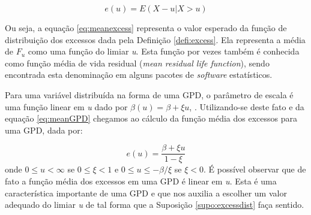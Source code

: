 \documentclass[review]{elsarticle}
\theoremstyle{definition}
\begin{document}
\begin{equation}
\label{eq:meanexcess}
e(u)=E\left(X-u | X > u\right)
\end{equation}

Ou seja, a equação \eqref{eq:meanexcess} representa o valor esperado da função de distribuição dos excessos dada pela Definição \ref{defi:excess}. Ela representa a média de $F_u$ como uma função do limiar \emph{u}. Esta função por vezes também é conhecida como função média de vida residual (\emph{mean residual life function}), sendo encontrada esta denominação em alguns pacotes de \emph{software} estatísticos.

Para uma variável distribuída na forma de uma GPD, o parâmetro de escala é uma função linear em \emph{u} dado por $\beta(u)=\beta + \xi u$, \cite[Teorema 3.4.13(e)]{Embrechts1997}. Utilizando-se deste fato e da equação \eqref{eq:meanGPD} chegamos ao cálculo da função média dos excessos para uma GPD, dada por:

\begin{equation}
\label{eq:eu}
e(u)=\frac{\beta+\xi u}{1-\xi}
\end{equation}
onde $0 \leq u < \infty$ se $0 \leq \xi <1$ e $0 \leq u \leq -\beta / \xi$ se $\xi < 0$. É possível observar que de fato a função média dos excessos em uma GPD é linear em \emph{u}. Esta é uma característica importante de uma GPD e que nos auxilia a escolher um valor adequado do limiar \emph{u} de tal forma que a Suposição \ref{supo:excessdist} faça sentido.

%
\end{document}
